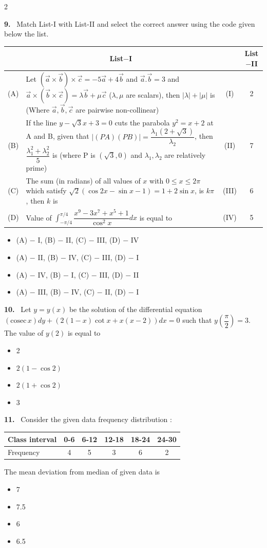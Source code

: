 \documentclass[10pt]{extarticle}
\newcommand{\qn}[1]{\par\smallskip\noindent\textbf{#1.}~}
\newenvironment{qoptions}{\begin{itemize}[leftmargin=1.8em,itemsep=1pt,topsep=2pt,label={}]}{\end{itemize}}
\newcommand{\opt}[2]{\item[(#1)] #2}
\begin{document}
\begin{multicols}{2}
\qn{9} Match List-I with List-II and select the correct answer using the code given below the list.
\par\nobreak
\begin{center}\small
\begin{tabular}{|c|p{3.9cm}|c|c|}\hline
 & \multicolumn{1}{c|}{\textbf{List$-$I}} & & \textbf{List$-$II}\\\hline
(A) & Let $\left(\vec a\times\vec b\right)\times\vec c=-5\vec a+4\vec b$ and $\vec a.\vec b=3$ and $\vec a\times\left(\vec b\times\vec c\right)=\lambda\vec b+\mu\vec c$ ($\lambda,\mu$ are scalars), then $|\lambda|+|\mu|$ is (Where $\vec a,\vec b,\vec c$ are pairwise non-collinear) & (I) & 2\\\hline
(B) & If the line $y-\sqrt3x+3=0$ cuts the parabola $y^2=x+2$ at A and B, given that $|(PA)(PB)|=\dfrac{\lambda_1\left(2+\sqrt3\right)}{\lambda_2}$, then $\dfrac{\lambda_1^2+\lambda_2^2}5$ is (where P is $\left(\sqrt3,0\right)$ and $\lambda_1,\lambda_2$ are relatively prime) & (II) & 7\\\hline
(C) & The sum (in radians) of all values of $x$ with $0\leq x\leq2\pi$ which satisfy $\sqrt2(\cos2x-\sin x-1)=1+2\sin x$, is $k\pi$, then $k$ is & (III) & 6\\\hline
(D) & Value of $\displaystyle\int_{-\pi/4}^{\pi/4}\dfrac{x^9-3x^7+x^5+1}{\cos^2x}dx$ is equal to & (IV) & 5\\\hline
\end{tabular}
\end{center}
\begin{qoptions}
\opt{A}{(A) $-$ I, (B) $-$ II, (C) $-$ III, (D) $-$ IV}
\opt{B}{(A) $-$ II, (B) $-$ IV, (C) $-$ III, (D) $-$ I}
\opt{C}{(A) $-$ IV, (B) $-$ I, (C) $-$ III, (D) $-$ II}
\opt{D}{(A) $-$ III, (B) $-$ IV, (C) $-$ II, (D) $-$ I}
\end{qoptions}

\qn{10} Let $y=y(x)$ be the solution of the differential equation $(\text{cosec}\,x)dy+(2(1-x)\cot x+x(x-2))dx=0$ such that $y\left(\dfrac\pi2\right)=3$. The value of $y(2)$ is equal to
\begin{qoptions}
\opt{A}{2}
\opt{B}{$2(1-\cos2)$}
\opt{C}{$2(1+\cos2)$}
\opt{D}{3}
\end{qoptions}

\qn{11} Consider the given data frequency distribution :
\begin{center}\small
\begin{tabular}{|l|c|c|c|c|c|}\hline
Class interval & 0-6 & 6-12 & 12-18 & 18-24 & 24-30\\\hline
Frequency & 4 & 5 & 3 & 6 & 2\\\hline
\end{tabular}
\end{center}
The mean deviation from median of given data is
\begin{qoptions}
\opt{A}{7}
\opt{B}{7.5}
\opt{C}{6}
\opt{D}{6.5}
\end{qoptions}


\end{multicols}
\end{document}
